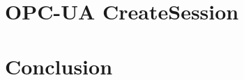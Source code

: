 \documentclass{llncs}
\newcommand{\opcua}{OPC-UA\xspace}
\begin{document}
\section{\opcua CreateSession}\label{sec:session}


%
%

\section{Conclusion}\label{sec:conclusion}




\end{document}
